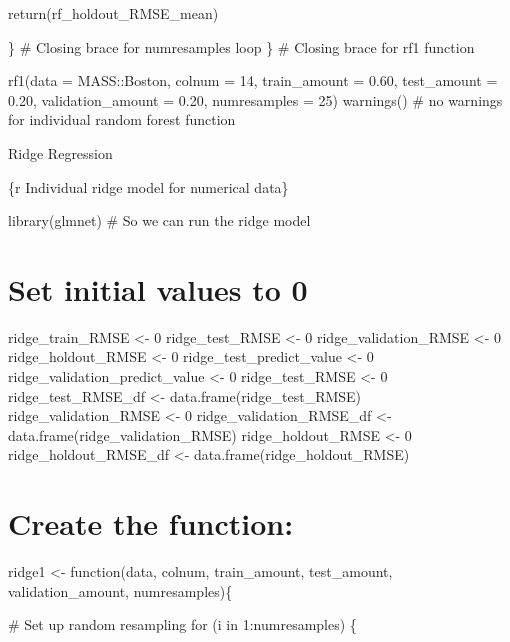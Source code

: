 \documentclass[
]{book}
\begin{document}
return(rf\_holdout\_RMSE\_mean)

\} \# Closing brace for numresamples loop \} \# Closing brace for rf1
function

rf1(data = MASS::Boston, colnum = 14, train\_amount = 0.60, test\_amount =
0.20, validation\_amount = 0.20, numresamples = 25) warnings() \# no
warnings for individual random forest function

Ridge Regression

\{r Individual ridge model for numerical data\}

library(glmnet) \# So we can run the ridge model

\chapter{Set initial values to 0}\label{set-initial-values-to-0-15}

ridge\_train\_RMSE \textless- 0 ridge\_test\_RMSE \textless- 0 ridge\_validation\_RMSE \textless- 0
ridge\_holdout\_RMSE \textless- 0 ridge\_test\_predict\_value \textless- 0
ridge\_validation\_predict\_value \textless- 0 ridge\_test\_RMSE \textless- 0
ridge\_test\_RMSE\_df \textless- data.frame(ridge\_test\_RMSE) ridge\_validation\_RMSE
\textless- 0 ridge\_validation\_RMSE\_df \textless- data.frame(ridge\_validation\_RMSE)
ridge\_holdout\_RMSE \textless- 0 ridge\_holdout\_RMSE\_df \textless-
data.frame(ridge\_holdout\_RMSE)

\chapter{Create the function:}\label{create-the-function-6}

ridge1 \textless- function(data, colnum, train\_amount, test\_amount,
validation\_amount, numresamples)\{

\# Set up random resampling for (i in 1:numresamples) \{
\end{document}
